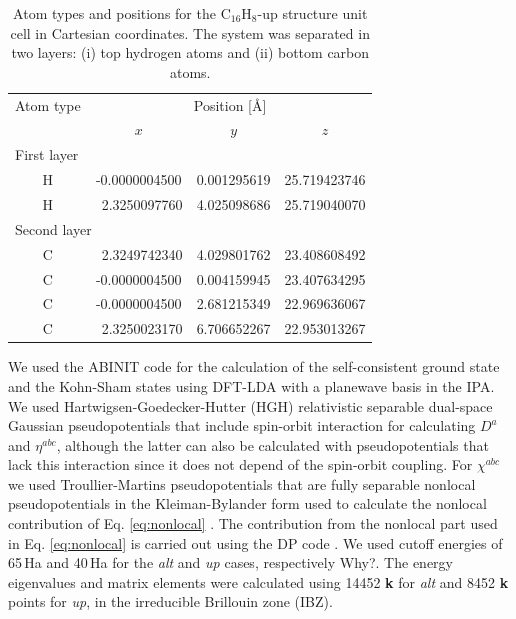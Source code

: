 \documentclass[pss]{wiley2sp} %
\begin{document}
\begin{table}[t]
  \begin{tabular}{cccc}
  \hline
  Atom type &  \multicolumn{3}{c}{Position [\AA]} \\
  \cline{2-4}
  & $x$ & $y$ & $z$ \\
  \hline
  \multicolumn{2}{l}{First layer}\\
H &  -0.0000004500 & 0.001295619 & 25.719423746 \\
H & \ 2.3250097760 & 4.025098686 & 25.719040070 \\
  \multicolumn{2}{l}{Second layer}\\
C & \ 2.3249742340 & 4.029801762 & 23.408608492 \\
C &  -0.0000004500 & 0.004159945 & 23.407634295 \\
C &  -0.0000004500 & 2.681215349 & 22.969636067 \\
C & \ 2.3250023170 & 6.706652267 & 22.953013267 \\
  \hline
  \end{tabular}
  \caption[]{%
  Atom types and positions for the C$_{16}$H$_{8}$-up structure unit cell in Cartesian coordinates. The system was separated in two layers: (i) top hydrogen atoms and (ii) bottom carbon atoms.}
  \label{tab:upstrc}
\end{table}

We used the ABINIT code \cite{torrentCMS08} for the calculation of the self-consistent ground state and the Kohn-Sham states using DFT-LDA with a planewave basis in the IPA. We used Hartwigsen-Goedecker-Hutter (HGH) relativistic separable dual-space Gaussian pseudopotentials \cite{hartwigsenPRB98} that include spin-orbit interaction for calculating $D^{a}$ and {$\eta^{abc}$}, although the latter can also be calculated with pseudopotentials that lack this interaction since it does not depend of the spin-orbit coupling. For $\chi^{abc}$ we used Troullier-Martins pseudopotentials \cite{troullierPRB91} that are fully separable nonlocal pseudopotentials in the Kleiman-Bylander form used to calculate the nonlocal contribution of Eq. \eqref{eq:nonlocal} \cite{kleinmanPRL82}. The contribution from the nonlocal part used in Eq. \eqref{eq:nonlocal} is carried out using the DP code \cite{olevanoDP}. We used cutoff energies of 65\,Ha and 40\,Ha for the \emph{alt} and \emph{up} cases, respectively {\Large Why?}. The energy eigenvalues and matrix elements were calculated using 14452 \textbf{k} for \emph{alt} and 8452 \textbf{k} points for \emph{up}, in the irreducible Brillouin zone (IBZ).
\end{document}

